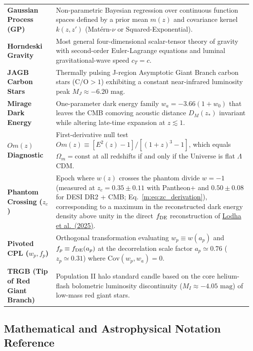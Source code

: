 \documentclass[aps,prd,preprint,superscriptaddress,nofootinbib]{revtex4-2}
\begin{document}
\begin{table}[!htbp]
\begin{tabularx}{\textwidth}{>{\bfseries\color{primary}}p{} X}
Gaussian Process (GP) & Non-parametric Bayesian regression over continuous function spaces defined by a prior mean $m(z)$ and covariance kernel $k(z,z')$ (Matérn-$\nu$ or Squared-Exponential). \\
Horndeski Gravity & Most general four-dimensional scalar-tensor theory of gravity with second-order Euler-Lagrange equations and luminal gravitational-wave speed $c_T = c$. \\
JAGB Carbon Stars & Thermally pulsing J-region Asymptotic Giant Branch carbon stars ($\text{C/O} > 1$) exhibiting a constant near-infrared luminosity peak $M_J \approx -6.20\text{ mag}$. \\
Mirage Dark Energy & One-parameter dark energy family $w_a = -3.66(1+w_0)$ that leaves the CMB comoving acoustic distance $D_M(z_*)$ invariant while altering late-time expansion at $z \lesssim 1$. \\
$Om(z)$ Diagnostic & First-derivative null test $Om(z) \equiv [E^2(z)-1]/[(1+z)^3-1]$, which equals $\Omega_m = \text{const}$ at all redshifts if and only if the Universe is flat $\Lambda$CDM. \\
Phantom Crossing ($z_c$) & Epoch where $w(z)$ crosses the phantom divide $w = -1$ (measured at $z_c = 0.35 \pm 0.11$ with Pantheon+ and $0.50 \pm 0.08$ for DESI DR2 + CMB; Eq.~\ref{m:eq:zc_derivation}), corresponding to a maximum in the reconstructed dark energy density above unity in the direct $f_{\rm DE}$ reconstruction of \href{https://arxiv.org/abs/2503.14743}{Lodha et al.\ (2025)}. \\
Pivoted CPL ($w_p, f_p$) & Orthogonal transformation evaluating $w_p \equiv w(a_p)$ and $f_p \equiv f_{\rm DE}(a_p)$ at the decorrelation scale factor $a_p \simeq 0.76$ ($z_p \simeq 0.31$) where $\text{Cov}(w_p, w_a) = 0$. \\
TRGB (Tip of Red Giant Branch) & Population II halo standard candle based on the core helium-flash bolometric luminosity discontinuity ($M_I \approx -4.05\text{ mag}$) of low-mass red giant stars. \\
\bottomrule
\end{tabularx}
\end{table}

\subsection{Mathematical and Astrophysical Notation Reference}
\end{document}

